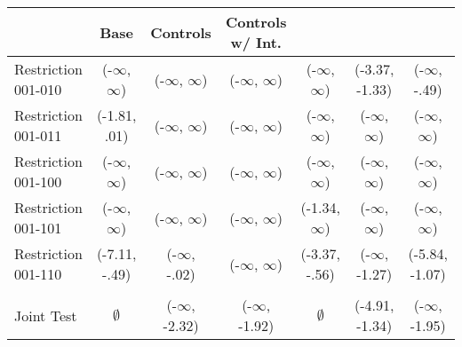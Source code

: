 \begin{tabular}{l*{6}{c}}}
\toprule
{} &           Base &      Controls & Controls w/ Int. \\
\midrule
Restriction 001-010 &      (-$\infty$, $\infty$) &     (-$\infty$, $\infty$) &        (-$\infty$, $\infty$)	&      (-$\infty$, $\infty$) &  (-3.37, -1.33) &      (-$\infty$, -.49)  	\\
Restriction 001-011 &   (-1.81, .01) &     (-$\infty$, $\infty$) &        (-$\infty$, $\infty$) 			&      (-$\infty$, $\infty$) &       (-$\infty$, $\infty$) &        (-$\infty$, $\infty$) \\
Restriction 001-100 &      (-$\infty$, $\infty$) &     (-$\infty$, $\infty$) &        (-$\infty$, $\infty$)	&      (-$\infty$, $\infty$) &       (-$\infty$, $\infty$) &        (-$\infty$, $\infty$) \\
Restriction 001-101 &      (-$\infty$, $\infty$) &     (-$\infty$, $\infty$) &        (-$\infty$, $\infty$)	&    (-1.34, $\infty$) &       (-$\infty$, $\infty$) &        (-$\infty$, $\infty$) \\
Restriction 001-110 &  (-7.11, -.49) &   (-$\infty$, -.02) &        (-$\infty$, $\infty$) 					&  (-3.37, -.56) &    (-$\infty$, -1.27) &   (-5.84, -1.07) \\
\hline\\Joint Test  &         $\emptyset$ &  (-$\infty$, -2.32) &     (-$\infty$, -1.92) 					&         $\emptyset$ &  (-4.91, -1.34) &     (-$\infty$, -1.95) \\
\bottomrule
\end{tabular}
